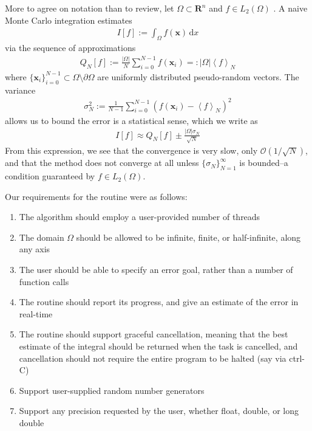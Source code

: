 \documentclass{ansarticle}
\begin{document}
More to agree on notation than to review, let $\Omega \subset \mathbf{R}^{n}$ and $f \in L_{2}(\Omega)$ \citep{weinzierl2000introduction}.
A naive Monte Carlo integration estimates
\begin{align*}
I[f] := \int_{\Omega} f(\mathbf{x}) \, \mathrm{d}x
\end{align*}
via the sequence of approximations
\begin{align*}
Q_{N}[f] :=  \frac{|\Omega|}{N} \sum_{i=0}^{N-1} f(\mathbf{x}_{i}) =: |\Omega|\left<f\right>_{N}
\end{align*}
where $\{\mathbf{x}_{i} \}_{i=0}^{N-1} \subset \Omega \setminus \partial \Omega$ are uniformly distributed pseudo-random vectors.
The variance
\begin{align*}
\sigma_{N}^{2} := \frac{1}{N-1} \sum_{i=0}^{N-1} \left( f(\mathbf{x}_{i}) - \left<f \right>_{N}\right)^{2}
\end{align*}
allows us to bound the error is a statistical sense, which we write as
\begin{align*}
I[f]  \approx Q_{N}[f] \pm \frac{|\Omega|\sigma_{N}}{\sqrt{N}}
\end{align*}
From this expression, we see that the convergence is very slow, only $\mathcal{O}(1/\sqrt{N})$, and that the method does not converge at all unless $\{\sigma_{N}\}_{N=1}^{\infty}$ is bounded--a condition guaranteed by $f \in L_{2}(\Omega)$.

Our requirements for the routine were as follows:

\begin{enumerate}
\item\label{Multithread} The algorithm should employ a user-provided number of threads
\item\label{Domain} The domain $\Omega$ should be allowed to be infinite, finite, or half-infinite, along any axis
\item\label{Error} The user should be able to specify an error goal, rather than a number of function calls
\item\label{Progress} The routine should report its progress, and give an estimate of the error in real-time
\item\label{Cancel} The routine should support graceful cancellation, meaning that the best estimate of the integral should be returned when the task is cancelled, and cancellation should not require the entire program to be halted (say via ctrl-C)
\item\label{UserRNG} Support user-supplied random number generators
\item\label{Precision} Support any precision requested by the user, whether float, double, or long double
\end{enumerate}
\end{document}
